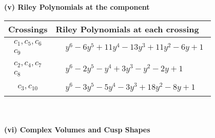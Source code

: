 \documentclass[1p]{elsarticle_modified}
\theoremstyle{definition}
\begin{document}
\newpage\renewcommand{\arraystretch}{1}
\flushleft \textbf{(v) Riley Polynomials at the component}\newline \\
\begin{tabular}{m{50pt}|m{274pt}}
Crossings & \hspace{64pt}Riley Polynomials at each crossing \\
\hline $$\begin{aligned}c_{1},c_{5},c_{6}\\c_{9}\end{aligned}$$&$\begin{aligned}
&y^6-6 y^5+11 y^4-13 y^3+11 y^2-6 y+1
\end{aligned}$\\
\hline $$\begin{aligned}c_{2},c_{4},c_{7}\\c_{8}\end{aligned}$$&$\begin{aligned}
&y^6-2 y^5- y^4+3 y^3- y^2-2 y+1
\end{aligned}$\\
\hline $$\begin{aligned}c_{3},c_{10}\end{aligned}$$&$\begin{aligned}
&y^6-3 y^5-5 y^4-3 y^3+18 y^2-8 y+1
\end{aligned}$\\
\hline
\end{tabular}\\~\\
\newpage\flushleft \textbf{(vi) Complex Volumes and Cusp Shapes}
\end{document}
